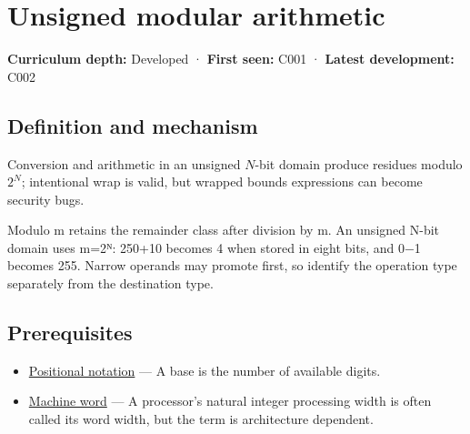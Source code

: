 \hypertarget{appendix-c99977d88b33}{}\label{referencestart:appendix-c99977d88b33}
\section{Unsigned modular arithmetic}\label{appendix-c99977d88b33-unsigned-modular-arithmetic}

\hypertarget{appendix-c99977d88b33-unsigned-modular-arithmetic}{}

\textbf{Curriculum depth:} Developed · \textbf{First seen:} C001 · \textbf{Latest development:} C002

\begin{allmightroledefinition}

\subsection{Definition and mechanism}\label{appendix-c99977d88b33-definition-and-mechanism}

\hypertarget{appendix-c99977d88b33-definition-and-mechanism}{}

Conversion and arithmetic in an unsigned \(N\)-bit domain produce residues modulo \(2^N\); intentional wrap is valid, but wrapped bounds expressions can become security bugs.

\end{allmightroledefinition}

Modulo m retains the remainder class after division by m. An unsigned N-bit domain uses m=2ᴺ: 250+10 becomes 4 when stored in eight bits, and 0−1 becomes 255. Narrow operands may promote first, so identify the operation type separately from the destination type.

\subsection{Prerequisites}\label{appendix-c99977d88b33-prerequisites}

\hypertarget{appendix-c99977d88b33-prerequisites}{}

\begin{itemize}
\tightlist
\item
  \hyperref[appendix-83c3f28f7bda]{Positional notation} --- A base is the number of available digits.
\item
  \hyperref[appendix-d67a19507dc5]{Machine word} --- A processor's natural integer processing width is often called its word width, but the term is architecture dependent.
\end{itemize}

